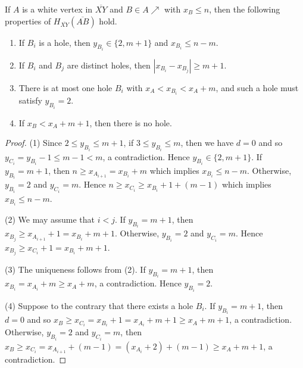 \documentclass[10pt,a4paper]{amsart}
\def\NEarrow#1{#1{\nearrow}}
\begin{document}
\begin{proposition}\label{prop7}
If $A$ is a white vertex in $\overline{XY}$ and $B\in\NEarrow{A}$ with $x_B\le n$,
then the following properties of $H_{\overline{XY}}(\overline{AB})$ hold.
\begin{enumerate}
\item[(1)]
If $B_i$ is a hole, then $y_{B_i}\in\{2,m+1\}$ and $x_{B_i}\le n-m$.

\item[(2)]
If $B_i$ and $B_j$ are distinct holes, then $|x_{B_i}-x_{B_j}|\ge m+1$.

\item[(3)]
There is at most one hole $B_i$ with $x_A<x_{B_i}<x_A+m$,
and such a hole must satisfy $y_{B_i}=2$.

\item[(4)]
If $x_B<x_A+m+1$, then there is no hole.
\end{enumerate}
\end{proposition}

\begin{proof}
(1)
Since $2\le y_{B_i}\le m+1$,
if $3\le  y_{B_i}\le m$, then we have $d=0$ and so $y_{C_i}=y_{B_i}-1\le m-1<m$,
a contradiction.
Hence $y_{B_i}\in\{2,m+1\}$.
If $y_{B_i}=m+1$, then $n\ge x_{A_{i+1}}=x_{B_i}+m$ which implies $x_{B_i}\le n-m$.
Otherwise, $y_{B_i}=2$ and $y_{C_i}=m$.
Hence $n\ge x_{C_i}\ge x_{B_i}+1+(m-1)$ which implies $x_{B_i}\le n-m$.

(2)
We may assume that $i<j$.
If $y_{B_i}=m+1$, then $x_{B_j}\ge x_{A_{i+1}}+1=x_{B_i}+m+1$.
Otherwise, $y_{B_i}=2$ and $y_{C_i}=m$.
Hence $x_{B_j}\ge x_{C_i}+1=x_{B_i}+m+1$.

(3)
The uniqueness follows from (2).
If $y_{B_i}=m+1$, then $x_{B_i}=x_{A_i}+m\ge x_A+m$, a contradiction.
Hence $y_{B_i}=2$.

(4)
Suppose to the contrary that there exists a hole $B_i$.
If $y_{B_i}=m+1$, then $d=0$ and
so $x_B\ge x_{C_i}=x_{B_i}+1=x_{A_i}+m+1\ge x_A+m+1$,
a contradiction.
Otherwise, $y_{B_i}=2$ and $y_{C_i}=m$,
then $x_B\ge x_{C_i}
= x_{A_{i+1}}+(m-1)= (x_{A_i}+2)+(m-1)\ge x_A+m+1$, a contradiction.
\end{proof}
\end{document}

